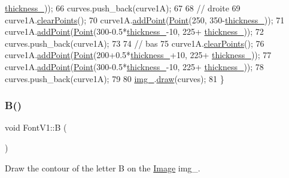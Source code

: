 \begin{DoxyCode}
      \mbox{\hyperlink{class_font_v1_aed8040e76be9a52833627b92f0fb4e5f}{thickness\_}}));
66     curves.push\_back(curve1A);
67 
68     \textcolor{comment}{// droite}
69     curve1A.\mbox{\hyperlink{class_bezier_curve_a0ba8ce66d5af5971ae6a1b506029728e}{clearPoints}}();
70     curve1A.\mbox{\hyperlink{class_bezier_curve_a38d16c18b36ae45619b05e26e226cf34}{addPoint}}(\mbox{\hyperlink{class_point}{Point}}(250, 350-\mbox{\hyperlink{class_font_v1_aed8040e76be9a52833627b92f0fb4e5f}{thickness\_}}));
71     curve1A.\mbox{\hyperlink{class_bezier_curve_a38d16c18b36ae45619b05e26e226cf34}{addPoint}}(\mbox{\hyperlink{class_point}{Point}}(300-0.5*\mbox{\hyperlink{class_font_v1_aed8040e76be9a52833627b92f0fb4e5f}{thickness\_}}-10, 225+
      \mbox{\hyperlink{class_font_v1_aed8040e76be9a52833627b92f0fb4e5f}{thickness\_}}));
72     curves.push\_back(curve1A);
73 
74     \textcolor{comment}{// bas}
75     curve1A.\mbox{\hyperlink{class_bezier_curve_a0ba8ce66d5af5971ae6a1b506029728e}{clearPoints}}();
76     curve1A.\mbox{\hyperlink{class_bezier_curve_a38d16c18b36ae45619b05e26e226cf34}{addPoint}}(\mbox{\hyperlink{class_point}{Point}}(200+0.5*\mbox{\hyperlink{class_font_v1_aed8040e76be9a52833627b92f0fb4e5f}{thickness\_}}+10, 225+
      \mbox{\hyperlink{class_font_v1_aed8040e76be9a52833627b92f0fb4e5f}{thickness\_}}));
77     curve1A.\mbox{\hyperlink{class_bezier_curve_a38d16c18b36ae45619b05e26e226cf34}{addPoint}}(\mbox{\hyperlink{class_point}{Point}}(300-0.5*\mbox{\hyperlink{class_font_v1_aed8040e76be9a52833627b92f0fb4e5f}{thickness\_}}-10, 225+
      \mbox{\hyperlink{class_font_v1_aed8040e76be9a52833627b92f0fb4e5f}{thickness\_}}));
78     curves.push\_back(curve1A);
79 
80     \mbox{\hyperlink{class_font_v1_a00569e3e3c4b70f437b63f396f735fb0}{img\_}}.\mbox{\hyperlink{class_image_a8d162f3cab956131d58708c09aa560b0}{draw}}(curves);
81 \}
\end{DoxyCode}
\mbox{\label{class_font_v1_a620ee7876d479807f73481f27be48f2a}} 
\subsubsection{\texorpdfstring{B()}{B()}}
{\footnotesize\ttfamily void Font\+V1\+::B (\begin{DoxyParamCaption}{ }\end{DoxyParamCaption})}



Draw the contour of the letter B on the \mbox{\hyperlink{class_image}{Image}} img\+\_\+. 


